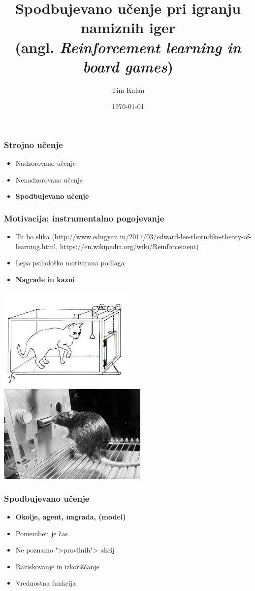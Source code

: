 \documentclass{beamer}    %
\author{Tim Kalan}
\institute[FMF]{Fakulteta za matematiko in fiziko}
\title{
    Spodbujevano učenje pri igranju namiznih iger \\ 
    \large (angl. \textit{Reinforcement learning in board games})}
\date{\today}
\begin{document}
\begin{frame}
    \titlepage
\end{frame}


\begin{frame}
    \frametitle{Strojno učenje}
    \begin{itemize}
        \item Nadzorovano učenje
        \item Nenadzorovano učenje
        \item \textbf{Spodbujevano učenje}
    \end{itemize}
\end{frame}


\begin{frame}
    \frametitle{Motivacija: instrumentalno pogojevanje}
    \begin{itemize}
        \item Tu bo slika 
        (http://www.edugyan.in/2017/03/edward-lee-thorndike-theory-of-learning.html, 
        https://en.wikipedia.org/wiki/Reinforcement)
        \item Lepa psihološko motivirana podlaga
        \item \textbf{Nagrade in kazni} 
    \end{itemize}
    \includegraphics[scale=0.6]{slike/macka.jpg}
    \includegraphics[scale=0.5]{slike/miska.jpg}
\end{frame}


\begin{frame}
    \frametitle{Spodbujevano učenje}
    \begin{itemize}
        \item \textbf{Okolje, agent, nagrada, (model)}
        \item Pomemben je čas
        \item Ne poznamo ">pravilnih"> akcij
        \item Raziskovanje in izkoriščanje
        \item Vrednostna funkcija
    \end{itemize}
\end{frame}
\end{document}
